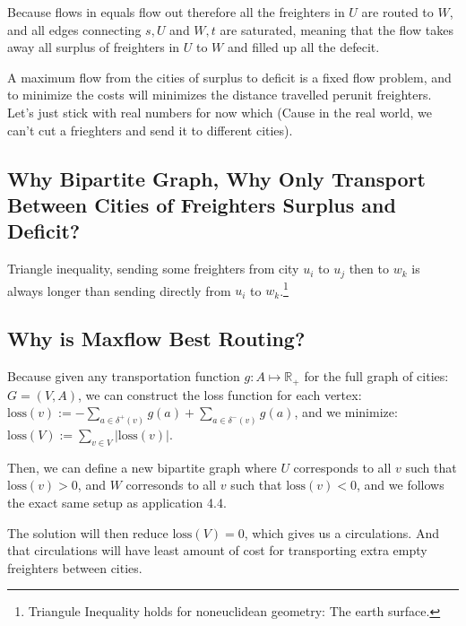 \documentclass[]{article}
\theoremstyle{definition}
\begin{document}
        \par
        Because flows in equals flow out therefore all the freighters in $U$ are routed to $W$, and all edges connecting $s, U$ and $W, t$ are saturated, meaning that the flow takes away all surplus of freighters in $U$ to $W$ and filled up all the defecit. 
        \par
        A maximum flow from the cities of surplus to deficit is a fixed flow problem, and to minimize the costs will minimizes the distance travelled perunit freighters. Let's just stick with real numbers for now which (Cause in the real world, we can't cut a frieghters and send it to different cities).
    \subsection{Why Bipartite Graph, Why Only Transport Between Cities of Freighters Surplus and Deficit? }
        Triangle inequality, sending some freighters from city $u_i$ to $u_j$ then to $w_k$ is always longer than sending directly from $u_i$ to $w_k$.\footnote{Triangule Inequality holds for noneuclidean geometry: The earth surface.}
    \subsection{Why is Maxflow Best Routing?}
        Because given any transportation function $g: A\mapsto \mathbb R_+$ for the full graph of cities: $G = (V, A)$, we can construct the loss function for each vertex: $\text{loss}(v):=-\sum_{a\in \delta^+(v)}^{} g(a) + \sum_{a \in \delta^-(v)}^{}g(a)$, and we minimize: $\text{loss}(V) := \sum_{v\in V}^{}|\text{loss}(v)|$. 
        \par
        Then, we can define a new bipartite graph where $U$ corresponds to all $v$ such that $\text{loss}(v) > 0$, and $W$ corresonds to all $v$ such that $\text{loss}(v) < 0$, and we follows the exact same setup as application 4.4. 
        \par
        The solution will then reduce $\text{loss}(V)=0$, which gives us a circulations. And that circulations will have least amount of cost for transporting extra empty freighters between cities. 
        
\end{document}
